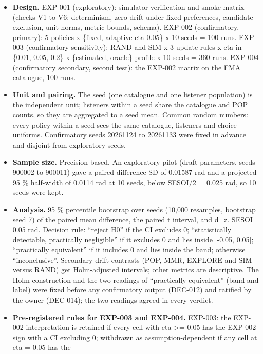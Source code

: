 \documentclass[
]{article}
\providecommand{\tightlist}{%
  \setlength{\itemsep}{0pt}\setlength{\parskip}{0pt}}
\begin{document}
\begin{itemize}
\tightlist
\item
  \textbf{Design.} EXP-001 (exploratory): simulator verification and
  smoke matrix (checks V1 to V6: determinism, zero drift under fixed
  preferences, candidate exclusion, unit norms, metric bounds, schema).
  EXP-002 (confirmatory, primary): 5 policies x \{fixed, adaptive eta
  0.05\} x 10 seeds = 100 runs. EXP-003 (confirmatory sensitivity): RAND
  and SIM x 3 update rules x eta in \{0.01, 0.05, 0.2\} x \{estimated,
  oracle\} profile x 10 seeds = 360 runs. EXP-004 (confirmatory
  secondary, second test): the EXP-002 matrix on the FMA catalogue, 100
  runs.
\item
  \textbf{Unit and pairing.} The seed (one catalogue and one listener
  population) is the independent unit; listeners within a seed share the
  catalogue and POP counts, so they are aggregated to a seed mean.
  Common random numbers: every policy within a seed sees the same
  catalogue, listeners and choice uniforms. Confirmatory seeds 20261124
  to 20261133 were fixed in advance and disjoint from exploratory seeds.
\item
  \textbf{Sample size.} Precision-based. An exploratory pilot (draft
  parameters, seeds 900002 to 900011) gave a paired-difference SD of
  0.01587 rad and a projected 95 \% half-width of 0.0114 rad at 10
  seeds, below SESOI/2 = 0.025 rad, so 10 seeds were kept.
\item
  \textbf{Analysis.} 95 \% percentile bootstrap over seeds (10,000
  resamples, bootstrap seed 7) of the paired mean difference, the paired
  t interval, and d\_z. SESOI 0.05 rad. Decision rule: ``reject H0'' if
  the CI excludes 0; ``statistically detectable, practically
  negligible'' if it excludes 0 and lies inside {[}-0.05, 0.05{]};
  ``practically equivalent'' if it includes 0 and lies inside the band;
  otherwise ``inconclusive''. Secondary drift contrasts (POP, MMR,
  EXPLORE and SIM versus RAND) get Holm-adjusted intervals; other
  metrics are descriptive. The Holm construction and the two readings of
  ``practically equivalent'' (band and label) were fixed before any
  confirmatory output (DEC-012) and ratified by the owner (DEC-014); the
  two readings agreed in every verdict.
\item
  \textbf{Pre-registered rules for EXP-003 and EXP-004.} EXP-003: the
  EXP-002 interpretation is retained if every cell with eta
  \textgreater= 0.05 has the EXP-002 sign with a CI excluding 0;
  withdrawn as assumption-dependent if any cell at eta = 0.05 has the

\end{itemize}
\end{document}
